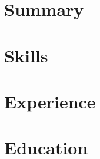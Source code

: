 \documentclass[dvipsnames,colorlinks=true]{moderncv}
\begin{document}
	\maketitle
	\section{Summary}
	
	\section{Skills}
	
	\section{Experience}
	
	\section{Education}
	
\end{document}
